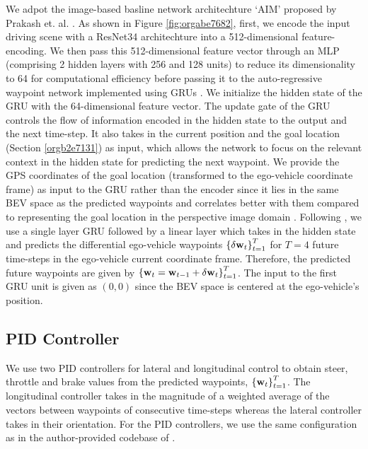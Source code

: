 \documentclass[letterpaper, 12pt]{book}
\theoremstyle{definition}
\theoremstyle{definition}
\theoremstyle{definition}
\theoremstyle{definition}
\theoremstyle{definition}
\begin{document}
We adpot the image-based basline network architechture `AIM' proposed by Prakash
et. al. \cite{Prakash2021}.  As shown in Figure \ref{fig:orgabe7682}, first, we encode the input
driving scene with a ResNet34 architechture into a 512-dimensional
feature-encoding. We then pass this 512-dimensional feature vector through an
MLP (comprising 2 hidden layers with 256 and 128 units) to reduce its
dimensionality to 64 for computational efficiency before passing it to the
auto-regressive waypoint network implemented using GRUs \cite{Cho2014}. We
initialize the hidden state of the GRU with the 64-dimensional feature
vector. The update gate of the GRU controls the flow of information encoded in
the hidden state to the output and the next time-step. It also takes in the
current position and the goal location (Section \ref{orgb2e7131}) as input, which allows the
network to focus on the relevant context in the hidden state for predicting the
next waypoint.  We provide the GPS coordinates of the goal location (transformed
to the ego-vehicle coordinate frame) as input to the GRU rather than the encoder
since it lies in the same BEV space as the predicted waypoints and correlates
better with them compared to representing the goal location in the perspective
image domain \cite{Chen2019}. Following \cite{Filos2020}, we use a single layer
GRU followed by a linear layer which takes in the hidden state and predicts the
differential ego-vehicle waypoints \(\left\lbrace \delta \textbf w_{t} \right\rbrace_{t=1}^{T}\) for \(T=4\)
future time-steps in the ego-vehicle current coordinate frame. Therefore, the
predicted future waypoints are given by \(\left\lbrace \textbf w_{t}=\textbf w_{t-1} +\delta \textbf
w_{t} \right\rbrace_{t=1}^{T}\). The input to the first GRU unit is given as \((0,0)\) since
the BEV space is centered at the ego-vehicle’s position.

\subsection{PID Controller}
\label{sec:org649e8f0}
We use two PID controllers for lateral and longitudinal control to obtain steer,
throttle and brake values from the predicted waypoints, \(\left\lbrace \textbf
w_{t} \right\rbrace_{t=1}^{T}\). The longitudinal controller takes in the magnitude of a
weighted average of the vectors between waypoints of consecutive time-steps
whereas the lateral controller takes in their orientation. For the PID
controllers, we use the same configuration as in the author-provided codebase of
\cite{Chen2019}.
\end{document}

